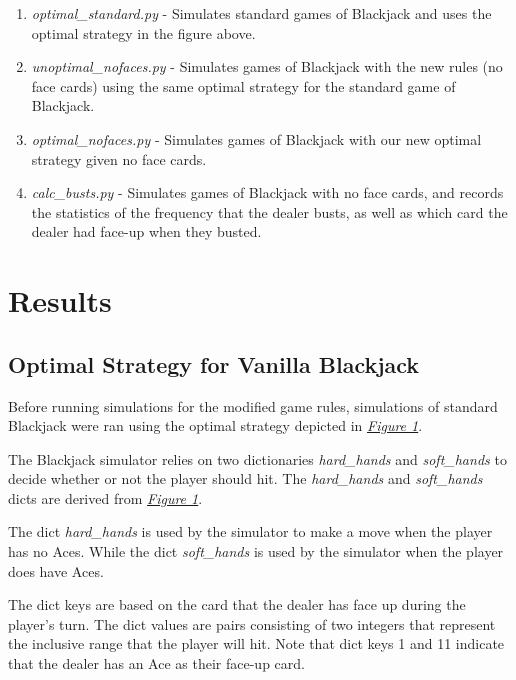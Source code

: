 \documentclass{article}
\begin{document}
		\begin{enumerate}
			\item \textit{optimal\_standard.py} - Simulates standard games of Blackjack and uses the optimal strategy in the figure above.
			\item \textit{unoptimal\_nofaces.py} - Simulates games of Blackjack with the new rules (no face cards) using the same optimal strategy for the standard game of Blackjack.
			\item \textit{optimal\_nofaces.py} - Simulates games of Blackjack with our new optimal strategy given no face cards.
			\item \textit{calc\_busts.py} - Simulates games of Blackjack with no face cards, and records the statistics of the frequency that the dealer busts, as well as which card the dealer 
				had face-up when they busted.
				
		\end{enumerate}

\vspace{0.5cm}
		
\section{Results}
\label{sec: Results}

    \subsection{Optimal Strategy for Vanilla Blackjack}
	\label{Optimal Strategy for Vanilla Blackjack}
		
		{\parindent0pt %
		Before running simulations for the modified game rules, simulations of standard Blackjack were ran using the optimal strategy depicted in \hyperlink{fig1}{\textit{Figure 1}}.
		
		The Blackjack simulator relies on two dictionaries \textit{hard\_hands} and \textit{soft\_hands} to decide whether or not the player should hit.
		The \textit{hard\_hands} and \textit{soft\_hands} dicts are derived from \hyperlink{fig1}{\textit{Figure 1}}.

		The dict \textit{hard\_hands} is used by the simulator to make a move when the player has no Aces. While the dict
		\textit{soft\_hands} is used by the simulator when the player does have Aces.

		The dict keys are based on the card that the dealer has face up during the player's turn.
		The dict values are pairs consisting of two integers that represent the inclusive range that the player will hit. 
		Note that dict keys 1 and 11 indicate that the dealer has an Ace as their face-up card.
		}
\end{document}
